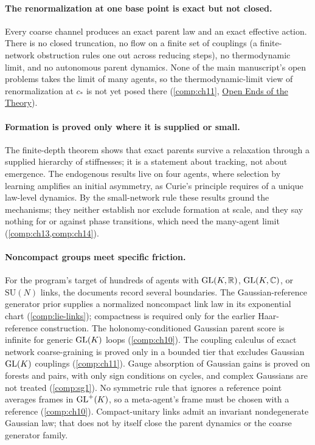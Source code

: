 \paragraph{The renormalization at one base point is exact but not closed.}
Every coarse channel produces an exact parent law and an exact effective action. There is no closed
truncation, no flow on a finite set of couplings (a finite-network obstruction rules one out across
reducing steps), no thermodynamic limit, and no autonomous parent dynamics. None of the main
manuscript's open problems takes the limit of many agents, so the thermodynamic-limit view of
renormalization at $c_*$ is not yet posed there (\cref{comp:ch11}, \hyperref[comp:open-ends]{Open
Ends of the Theory}).

\paragraph{Formation is proved only where it is supplied or small.}
The finite-depth theorem shows that exact parents survive a relaxation through a supplied hierarchy
of stiffnesses; it is a statement about tracking, not about emergence. The endogenous results live
on four agents, where selection by learning amplifies an initial asymmetry, as Curie's principle
requires of a unique law-level dynamics. By the small-network rule these results ground the
mechanisms; they neither establish nor exclude formation at scale, and they say nothing for or
against phase transitions, which need the many-agent limit (\cref{comp:ch13,comp:ch14}).

\paragraph{Noncompact groups meet specific friction.}
For the program's target of hundreds of agents with $\mathrm{GL}(K,\mathbb R)$, $\mathrm{GL}(K,\mathbb C)$, or $\mathrm{SU}(N)$
links, the documents record several boundaries. The Gaussian-reference generator prior supplies
a normalized noncompact link law in its exponential chart (\cref{comp:lie-links}); compactness
is required only for the earlier Haar-reference construction. The holonomy-conditioned Gaussian parent score is infinite for
generic $\mathrm{GL}(K)$ loops (\cref{comp:ch10}). The coupling calculus of exact network coarse-graining
is proved only in a bounded tier that excludes Gaussian $\mathrm{GL}(K)$ couplings (\cref{comp:ch11}). Gauge
absorption of Gaussian gains is proved on forests and pairs, with only sign conditions on cycles, and
complex Gaussians are not treated (\cref{comp:sg1}). No symmetric rule that ignores a reference point
averages frames in $\mathrm{GL}^+(K)$, so a meta-agent's frame must be chosen with a reference
(\cref{comp:ch10}). Compact-unitary links admit an invariant nondegenerate Gaussian law; that
does not by itself close the parent dynamics or the coarse generator family.

